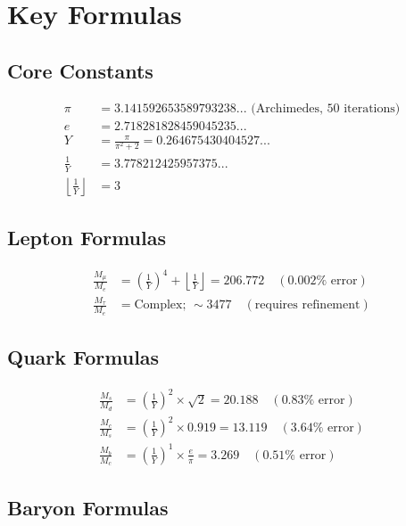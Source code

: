 \documentclass[11pt,twocolumn]{article}
\begin{document}
\section{Key Formulas}

\subsection{Core Constants}

\begin{align}
\pi &= 3.141592653589793238... \text{ (Archimedes, 50 iterations)} \\
e &= 2.718281828459045235... \\
Y &= \frac{\pi}{\pi^2 + 2} = 0.264675430404527... \\
\frac{1}{Y} &= 3.778212425957375... \\
\left\lfloor \frac{1}{Y} \right\rfloor &= 3
\end{align}

\subsection{Lepton Formulas}

\begin{align}
\frac{M_\mu}{M_e} &= \left(\frac{1}{Y}\right)^4 + \left\lfloor \frac{1}{Y} \right\rfloor = 206.772 \quad (0.002\% \text{ error}) \\
\frac{M_\tau}{M_e} &= \text{Complex; } \sim 3477 \quad (\text{requires refinement})
\end{align}

\subsection{Quark Formulas}

\begin{align}
\frac{M_s}{M_d} &= \left(\frac{1}{Y}\right)^2 \times \sqrt{2} = 20.188 \quad (0.83\% \text{ error}) \\
\frac{M_c}{M_s} &= \left(\frac{1}{Y}\right)^2 \times 0.919 = 13.119 \quad (3.64\% \text{ error}) \\
\frac{M_b}{M_c} &= \left(\frac{1}{Y}\right)^1 \times \frac{e}{\pi} = 3.269 \quad (0.51\% \text{ error})
\end{align}

\subsection{Baryon Formulas}
\end{document}
